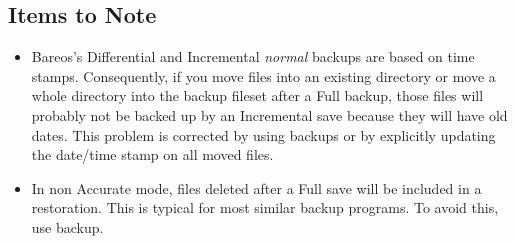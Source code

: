 \subsection{Items to Note}
\begin{itemize}
\item Bareos's Differential and Incremental \textsl{normal} backups are based
  on time stamps.  Consequently, if you move files into an existing directory
  or move a whole directory into the backup fileset after a Full backup, those
  files will probably not be backed up by an Incremental save because they will
  have old dates.  This problem is corrected by using  backups
  or by explicitly updating the date/time stamp on all moved files.
\item In non Accurate mode, files deleted after a Full save will be
  included in a restoration. This is typical for most similar backup programs.
  To avoid this, use  backup.
\end{itemize}
